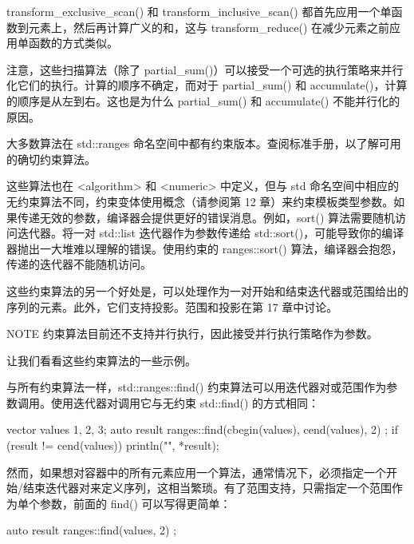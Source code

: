 transform\_exclusive\_scan() 和 transform\_inclusive\_scan() 都首先应用一个单函数到元素上，然后再计算广义的和，这与 transform\_reduce() 在减少元素之前应用单函数的方式类似。

注意，这些扫描算法（除了 partial\_sum()）可以接受一个可选的执行策略来并行化它们的执行。计算的顺序不确定，而对于 partial\_sum() 和 accumulate()，计算的顺序是从左到右。这也是为什么 partial\_sum() 和 accumulate() 不能并行化的原因。


大多数算法在 std::ranges 命名空间中都有约束版本。查阅标准手册，以了解可用的确切约束算法。

这些算法也在 <algorithm> 和 <numeric> 中定义，但与 std 命名空间中相应的无约束算法不同，约束变体使用概念（请参阅第 12 章）来约束模板类型参数。如果传递无效的参数，编译器会提供更好的错误消息。例如，sort() 算法需要随机访问迭代器。将一对 std::list 迭代器作为参数传递给 std::sort()，可能导致你的编译器抛出一大堆难以理解的错误。使用约束的 ranges::sort() 算法，编译器会抱怨，传递的迭代器不能随机访问。

这些约束算法的另一个好处是，可以处理作为一对开始和结束迭代器或范围给出的序列的元素。此外，它们支持投影。范围和投影在第 17 章中讨论。

\begin{myNotic}{NOTE}
约束算法目前还不支持并行执行，因此接受并行执行策略作为参数。
\end{myNotic}

让我们看看这些约束算法的一些示例。


与所有约束算法一样，std::ranges::find() 约束算法可以用迭代器对或范围作为参数调用。使用迭代器对调用它与无约束 std::find() 的方式相同：

\begin{cpp}
vector values {1, 2, 3};
auto result { ranges::find(cbegin(values), cend(values), 2) };
if (result != cend(values)) { println("{}", *result); }
\end{cpp}

然而，如果想对容器中的所有元素应用一个算法，通常情况下，必须指定一个开始/结束迭代器对来定义序列，这相当繁琐。有了范围支持，只需指定一个范围作为单个参数，前面的 find() 可以写得更简单：

\begin{cpp}
auto result { ranges::find(values, 2) };
\end{cpp}


